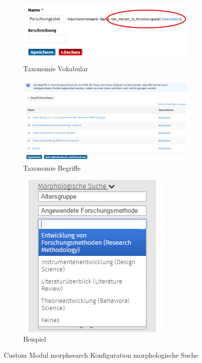 \begin{itemize}[parsep=0pt, itemsep=5.0pt plus 2.0pt minus 1.0pt, leftmargin=*]
	\begin{figure}[H]
		\centering
		\begin{subfigure}[b]{0.35\textwidth}
			\centering
			\includegraphics[width=0.95\linewidth]{images/config_morphsearch_taxvoc}
			\caption[]{Taxonomie Vokabular}
			\label{fig:config_morphsearch_taxvoc}
		\end{subfigure}
		\begin{subfigure}[b]{0.40\textwidth}
			\centering
			\includegraphics[height=0.13\textheight]{images/config_morphsearch_taxvocbegriff}
			\caption[]{Taxonomie Begriffe}
			\label{fig:config_morphsearch_taxvocbegriff}
		\end{subfigure}
		\begin{subfigure}[b]{0.18\textwidth}
			\centering
			\includegraphics[height=0.13\textheight]{images/example_morphsearch_morphological}
			\caption[]{Beispiel}
			\label{fig:example_morphsearch_morphological}
		\end{subfigure}
		\caption{Custom Modul morphsearch Konfiguration morphologische Suche}
		\label{fig:config_morphsearch_morphological}
	\end{figure}


\end{itemize}
